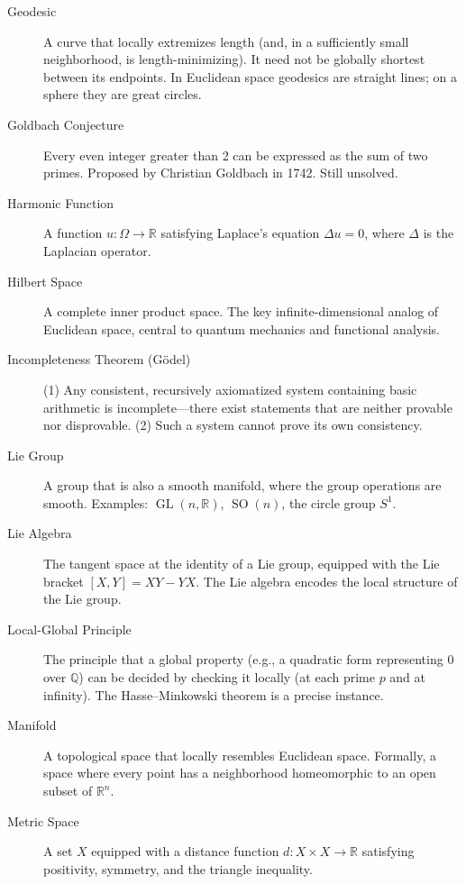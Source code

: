 \begin{description}
    \item[Geodesic] A curve that locally extremizes length (and, in a sufficiently small neighborhood, is length-minimizing). It need not be globally shortest between its endpoints. In Euclidean space geodesics are straight lines; on a sphere they are great circles.

    \item[Goldbach Conjecture] Every even integer greater than 2 can be expressed as the sum of two primes. Proposed by Christian Goldbach in 1742. Still unsolved.

    \item[Harmonic Function] A function $u: \Omega \to \mathbb{R}$ satisfying Laplace's equation $\Delta u = 0$, where $\Delta$ is the Laplacian operator.

    \item[Hilbert Space] A complete inner product space. The key infinite-dimensional analog of Euclidean space, central to quantum mechanics and functional analysis.

    \item[Incompleteness Theorem (G\"odel)] (1) Any consistent, recursively axiomatized system containing basic arithmetic is incomplete---there exist statements that are neither provable nor disprovable. (2) Such a system cannot prove its own consistency.

    \item[Lie Group] A group that is also a smooth manifold, where the group operations are smooth. Examples: $\operatorname{GL}(n, \mathbb{R})$, $\operatorname{SO}(n)$, the circle group $S^1$.

    \item[Lie Algebra] The tangent space at the identity of a Lie group, equipped with the Lie bracket $[X, Y] = XY - YX$. The Lie algebra encodes the local structure of the Lie group.

    \item[Local-Global Principle] The principle that a global property (e.g., a quadratic form representing 0 over $\mathbb{Q}$) can be decided by checking it locally (at each prime $p$ and at infinity). The Hasse--Minkowski theorem is a precise instance.

    \item[Manifold] A topological space that locally resembles Euclidean space. Formally, a space where every point has a neighborhood homeomorphic to an open subset of $\mathbb{R}^n$.

    \item[Metric Space] A set $X$ equipped with a distance function $d: X \times X \to \mathbb{R}$ satisfying positivity, symmetry, and the triangle inequality.


\end{description}
